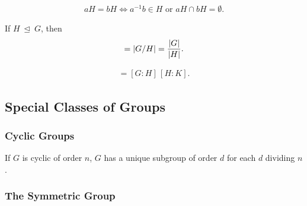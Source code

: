 \begin{definition}
\begin{fact}
\end{fact}

\begin{theorem}

\begin{align*}
aH = bH \iff a^{-1}b \in H \text{ or } aH \cap bH = \emptyset
.\end{align*}

\end{theorem}

\begin{theorem}

If \(H{~\trianglelefteq~}G\), then
\begin{align*}  
[G: H] = {\left\lvert {G/H} \right\rvert} = {{\left\lvert {G} \right\rvert} \over {\left\lvert {H} \right\rvert}}
.\end{align*}

\end{theorem}

\begin{theorem}

\begin{align*}  
[G:K] = [G:H]\, [H:K]
.\end{align*}

\end{theorem}

\end{definition}

\hypertarget{special-classes-of-groups}{%
\subsection{Special Classes of Groups}\label{special-classes-of-groups}}

\hypertarget{cyclic-groups}{%
\subsubsection{Cyclic Groups}\label{cyclic-groups}}

\begin{theorem}

If \(G\) is cyclic of order \(n\), \(G\) has a unique subgroup of order
\(d\) for each \(d\) dividing \(n\).

\end{theorem}

\hypertarget{the-symmetric-group}{%
\subsubsection{The Symmetric Group}\label{the-symmetric-group}}

